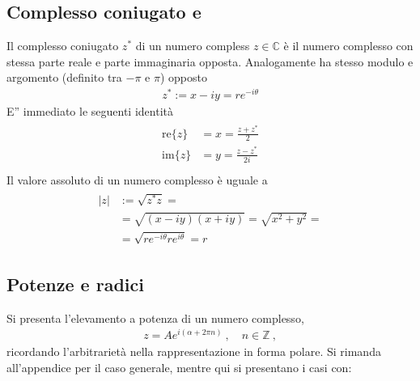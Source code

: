 \documentclass[letterpaper,10pt,italian]{jupyterBook}
\begin{document}
\subsection{Complesso coniugato e}
\label{\detokenize{ch/algebra/complex-algebra:complesso-coniugato-e}}
\sphinxAtStartPar
{} Il complesso coniugato \(z^*\) di un numero compless \(z \in \mathbb{C}\) è il numero complesso con stessa parte reale e parte immaginaria opposta. Analogamente ha stesso modulo e argomento (definito tra \(-\pi\) e \(\pi\)) opposto
\begin{equation*}
\begin{split}z^* := x - i y = r e^{-i\theta} \end{split}
\end{equation*}
\sphinxAtStartPar
E” immediato {\hyperref[\detokenize{ch/algebra/complex-algebra-problems:math-hs-algebra-complex-problems-operations-cc-re-im}]{}} le seguenti identità
\begin{equation}\label{equation:ch/algebra/complex-algebra:complex:cc:re-im}
\begin{split}\begin{aligned}
  \text{re}\{ z \} & = x = \frac{z + z^*}{2} \\
  \text{im}\{ z \} & = y = \frac{z - z^*}{2i} \\
\end{aligned}\end{split}
\end{equation}
\sphinxAtStartPar
{} Il valore assoluto di un numero complesso è uguale a
\begin{equation*}
\begin{split}\begin{aligned}
    |z| & := \sqrt{z^* z} = \\
    & = \sqrt{(x-iy)(x+iy)} =  \sqrt{x^2 + y^2} = \\
    & = \sqrt{r e^{-i\theta} r e^{i\theta}} = r
  \end{aligned}\end{split}
\end{equation*}

\subsection{Potenze e radici}
\label{\detokenize{ch/algebra/complex-algebra:potenze-e-radici}}
\sphinxAtStartPar
{} Si presenta l’elevamento a potenza di un numero complesso,
\begin{equation*}
\begin{split}z = A e^{i (\alpha + 2 \pi n)} \ , \quad n \in \mathbb{Z} \ ,\end{split}
\end{equation*}
\sphinxAtStartPar
ricordando l’arbitrarietà nella rappresentazione in forma polare. Si rimanda all’appendice per il caso generale, mentre qui si presentano i casi con:
\end{document}
